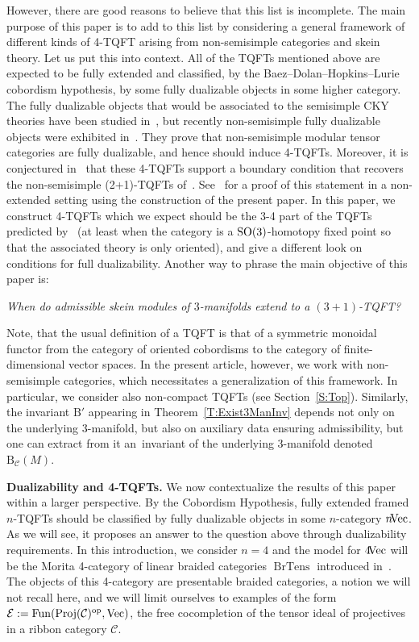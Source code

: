 \documentclass[pdftex]{sigma}
\numberwithin{equation}{section}
\numberwithin{theorem}{section}
\numberwithin{proposition}{section}
\numberwithin{definition}{section}
\numberwithin{lemma}{section}
\numberwithin{corollary}{section}
\numberwithin{remark}{section}
\numberwithin{example}{section}
\newcommand{\cat}{\mathcal{C}}
\newcommand{\CC}{\mathcal{C}}
\newcommand{\EE}{\mathcal{E}}
\newcommand{\Vect}{\mathrm{Vec}}
\newcommand{\ThreeManInv}{\mathrm{B}}
\begin{document}
However, there are good reasons to believe that this list is incomplete.
The main purpose of this paper is to add to this list by considering a general framework of different kinds of 4-TQFT arising from non-semisimple categories and skein theory. Let us put this into context.
All
of
the TQFTs mentioned above are expected to be fully extended and classified, by the Baez--Dolan--Hopkins--Lurie cobordism hypothesis, by some fully dualizable objects in some higher category. The fully dualizable objects that would be associated to the semisimple CKY theories have been studied in~\cite{BJS}, but recently non-semisimple fully dualizable objects were exhibited in~\cite{BJSS}. They prove that non-semisimple modular tensor categories are fully dualizable, and hence should induce 4-TQFTs. Moreover, it is conjectured in~\cite{Haioun} that these 4-TQFTs support a boundary condition that recovers the non-semisimple (2+1)-TQFTs of~\cite{DRGGPMR2022}. See~\cite{HaiounWRT} for a proof of this statement in a non-extended setting using the construction of the present paper.
In this paper, we construct 4-TQFTs which
we expect should be the 3-4 part of
the TQFTs predicted by~\cite{BJSS}
(at least when the category is a ${\rm SO}(3)$-homotopy fixed point so that the associated theory is only oriented),
and give a different look on conditions for full dualizability.
Another way to phrase the main objective of this paper is:
\begin{center}
 \it When do admissible skein modules of $3$-manifolds extend to a $(3+1)$-TQFT?
\end{center}

Note, that the usual definition of a TQFT is that of a symmetric monoidal functor from the category of oriented cobordisms to the category of finite-dimensional vector spaces. In the present article, however, we work with non-semisimple categories, which necessitates a generalization of this framework.
In particular, we consider also non-compact TQFTs (see Section~\ref{S:Top}).
Similarly, the invariant $\ThreeManInv'$ appearing in Theorem~\ref{T:Exist3ManInv} depends not only on the underlying 3-manifold, but also on auxiliary data ensuring admissibility,
but one can extract from it an~invariant of the underlying $3$-manifold denoted $\ThreeManInv_{\cat}(M)$.

\textbf{Dualizability and 4-TQFTs.}
We now contextualize the results of this paper within a larger perspective.
By the Cobordism Hypothesis, fully extended framed $n$-TQFTs should be classified by fully dualizable objects in some $n$-category $n\hskip-2pt\Vect$. As we will see, it proposes an answer to the question above through dualizability requirements. In this introduction, we consider $n=4$ and the model for $4\hskip-2pt\Vect$
will be
 the Morita 4-category of linear braided categories $\operatorname{BrTens}$ introduced in~\cite{BJS, JFS}.
The objects of this 4-category are presentable braided categories, a notion we will not recall here, and we will limit ourselves to examples of the form $\EE:= \operatorname{Fun}(\operatorname{Proj}(\CC)^{\rm op}, \Vect)$, the free cocompletion of the tensor ideal of projectives in a ribbon category $\CC$.
\end{document}
